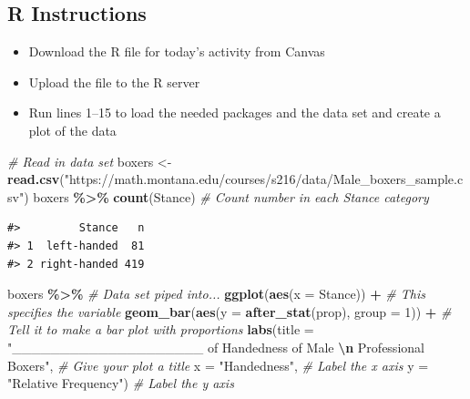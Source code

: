 \documentclass[
]{report}
\newenvironment{Shaded}{\begin{snugshade}}{\end{snugshade}}
\newcommand{\AttributeTok}[1]{\textcolor[rgb]{0.13,0.29,0.53}{#1}}
\newcommand{\CommentTok}[1]{\textcolor[rgb]{0.56,0.35,0.01}{\textit{#1}}}
\newcommand{\DecValTok}[1]{\textcolor[rgb]{0.00,0.00,0.81}{#1}}
\newcommand{\FunctionTok}[1]{\textcolor[rgb]{0.13,0.29,0.53}{\textbf{#1}}}
\newcommand{\NormalTok}[1]{#1}
\newcommand{\OtherTok}[1]{\textcolor[rgb]{0.56,0.35,0.01}{#1}}
\newcommand{\SpecialCharTok}[1]{\textcolor[rgb]{0.81,0.36,0.00}{\textbf{#1}}}
\newcommand{\StringTok}[1]{\textcolor[rgb]{0.31,0.60,0.02}{#1}}
\begin{document}
\vspace{2mm}

\subsection*{R Instructions}\label{r-instructions-1}

\begin{itemize}
\item
  Download the R file for today's activity from Canvas
\item
  Upload the file to the R server
\item
  Run lines 1--15 to load the needed packages and the data set and create a plot of the data
\end{itemize}

\begin{Shaded}
\begin{Highlighting}[]
 \CommentTok{\# Read in data set}
\NormalTok{boxers }\OtherTok{\textless{}{-}} \FunctionTok{read.csv}\NormalTok{(}\StringTok{"https://math.montana.edu/courses/s216/data/Male\_boxers\_sample.csv"}\NormalTok{)}
\NormalTok{boxers }\SpecialCharTok{\%\textgreater{}\%} \FunctionTok{count}\NormalTok{(Stance)  }\CommentTok{\# Count number in each Stance category}
\end{Highlighting}
\end{Shaded}

\begin{verbatim}
#>         Stance   n
#> 1  left-handed  81
#> 2 right-handed 419
\end{verbatim}

\newpage

\begin{Shaded}
\begin{Highlighting}[]
\NormalTok{boxers }\SpecialCharTok{\%\textgreater{}\%} \CommentTok{\# Data set piped into...}
    \FunctionTok{ggplot}\NormalTok{(}\FunctionTok{aes}\NormalTok{(}\AttributeTok{x =}\NormalTok{ Stance)) }\SpecialCharTok{+}   \CommentTok{\# This specifies the variable}
    \FunctionTok{geom\_bar}\NormalTok{(}\FunctionTok{aes}\NormalTok{(}\AttributeTok{y =} \FunctionTok{after\_stat}\NormalTok{(prop), }\AttributeTok{group =} \DecValTok{1}\NormalTok{)) }\SpecialCharTok{+}  \CommentTok{\# Tell it to make a bar plot with proportions}
    \FunctionTok{labs}\NormalTok{(}\AttributeTok{title =} \StringTok{"\_\_\_\_\_\_\_\_\_\_\_\_\_\_\_\_\_\_\_\_ of Handedness of Male }\SpecialCharTok{\textbackslash{}n}\StringTok{ Professional Boxers"}\NormalTok{,  }
       \CommentTok{\# Give your plot a title}
       \AttributeTok{x =} \StringTok{"Handedness"}\NormalTok{,   }\CommentTok{\# Label the x axis}
       \AttributeTok{y =} \StringTok{"Relative Frequency"}\NormalTok{)  }\CommentTok{\# Label the y axis}
\end{Highlighting}
\end{Shaded}
\end{document}
